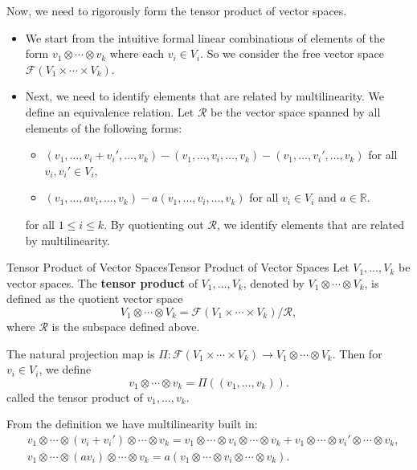 \documentclass[../main.tex]{subfiles}
\begin{document}
Now, we need to rigorously form the tensor product of vector spaces.
\begin{itemize}
  \item We start from the intuitive formal linear combinations of elements of the form $v_1 \otimes \cdots \otimes v_k$ where each $v_i \in V_i$. So we consider the free vector space $\mathcal{F}(V_1 \times \cdots \times V_k)$.
  \item Next, we need to identify elements that are related by multilinearity. We define an equivalence relation. Let $\mathcal{R}$ be the vector space spanned by all elements of the following forms:
    \begin{itemize}
      \item $(v_1, \ldots, v_i + v_i', \ldots, v_k) - (v_1, \ldots, v_i, \ldots, v_k) - (v_1, \ldots, v_i', \ldots, v_k)$ for all $v_i, v_i' \in V_i$,
      \item $(v_1, \ldots, a v_i, \ldots, v_k) - a (v_1, \ldots, v_i, \ldots, v_k)$ for all $v_i \in V_i$ and $a \in \mathbb{R}$.
    \end{itemize}
    for all $1 \leq i \leq k$. By quotienting out $\mathcal{R}$, we identify elements that are related by multilinearity.
\end{itemize}

\begin{definition}{Tensor Product of Vector Spaces}{Tensor Product of Vector Spaces}
  Let $V_1, \ldots, V_k$ be vector spaces. The \textbf{tensor product} of $V_1, \ldots, V_k$, denoted by $V_1 \otimes \cdots \otimes V_k$, is defined as the quotient vector space
  \begin{equation}
    V_1 \otimes \cdots \otimes V_k = \mathcal{F}(V_1 \times \cdots \times V_k) / \mathcal{R},
  \end{equation}
  where $\mathcal{R}$ is the subspace defined above.

  The natural projection map is $\Pi: \mathcal{F}(V_1 \times \cdots \times V_k) \to V_1 \otimes \cdots \otimes V_k$. Then for $v_i \in V_i$, we define
  \begin{equation}
    v_1 \otimes \cdots \otimes v_k = \Pi((v_1, \ldots, v_k)).
  \end{equation}
  called the tensor product of $v_1, \ldots, v_k$.
\end{definition}

From the definition we have multilinearity built in:
\begin{equation*}
  \begin{aligned}
    & v_1 \otimes \cdots \otimes (v_i + v_i') \otimes \cdots \otimes v_k = v_1 \otimes \cdots \otimes v_i \otimes \cdots \otimes v_k + v_1 \otimes \cdots \otimes v_i' \otimes \cdots \otimes v_k, \\
    & v_1 \otimes \cdots \otimes (a v_i) \otimes \cdots \otimes v_k = a (v_1 \otimes \cdots \otimes v_i \otimes \cdots \otimes v_k).
  \end{aligned}
\end{equation*}
\end{document}
